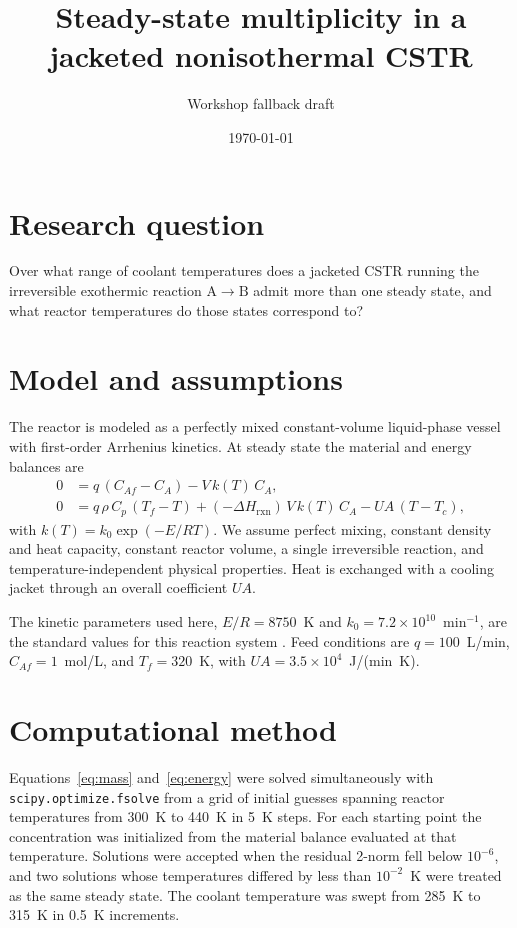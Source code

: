 \documentclass[11pt]{article}
\title{Steady-state multiplicity in a jacketed nonisothermal CSTR}
\author{Workshop fallback draft}
\date{\today}
\begin{document}
\maketitle

\section{Research question}
\label{sec:question}

Over what range of coolant temperatures does a jacketed CSTR running the
irreversible exothermic reaction $\mathrm{A} \rightarrow \mathrm{B}$ admit more
than one steady state, and what reactor temperatures do those states correspond
to?

\section{Model and assumptions}
\label{sec:model}

The reactor is modeled as a perfectly mixed constant-volume liquid-phase vessel
with first-order Arrhenius kinetics. At steady state the material and energy
balances are
\begin{align}
  0 &= q\,(C_{Af} - C_A) - V\,k(T)\,C_A, \label{eq:mass}\\
  0 &= q\,\rho\,C_p\,(T_f - T) + (-\Delta H_{\mathrm{rxn}})\,V\,k(T)\,C_A
       - UA\,(T - T_c), \label{eq:energy}
\end{align}
with $k(T) = k_0 \exp(-E/RT)$. We assume perfect mixing, constant density and
heat capacity, constant reactor volume, a single irreversible reaction, and
temperature-independent physical properties. Heat is exchanged with a cooling
jacket through an overall coefficient $UA$.

The kinetic parameters used here, $E/R = 8750$~K and
$k_0 = 7.2 \times 10^{10}$~min$^{-1}$, are the standard values for this
reaction system \cite{woolf2009cstr}. Feed conditions are $q = 100$~L/min,
$C_{Af} = 1$~mol/L, and $T_f = 320$~K, with $UA = 3.5 \times 10^{4}$~J/(min~K).

\section{Computational method}
\label{sec:method}

Equations~\eqref{eq:mass} and~\eqref{eq:energy} were solved simultaneously with
\texttt{scipy.optimize.fsolve} from a grid of initial guesses spanning reactor
temperatures from 300~K to 440~K in 5~K steps. For each starting point the
concentration was initialized from the material balance evaluated at that
temperature. Solutions were accepted when the residual 2-norm fell below
$10^{-6}$, and two solutions whose temperatures differed by less than
$10^{-2}$~K were treated as the same steady state. The coolant temperature was
swept from 285~K to 315~K in 0.5~K increments.
\end{document}
